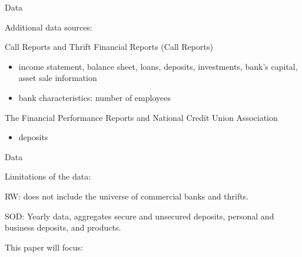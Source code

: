 \documentclass[notes,11pt, aspectratio=169]{beamer}
\newenvironment{wideitemize}{\itemize\addtolength{\itemsep}{10pt}}{\enditemize}
\begin{document}
    \begin{frame}{Data}

    Additional data sources:
    \vspace{0.3cm}
    \begin{wideitemize}
      \item Call Reports and Thrift Financial Reports (Call Reports)
        
      \begin{itemize}
          \item income statement, balance sheet, loans, deposits, investments,  bank's capital, asset sale information
          \item bank characteristics: number of employees
        
          
      \end{itemize}

      \item The Financial Performance Reports and National Credit Union Association
        \begin{itemize}
          \item deposits 
      \end{itemize}
    \end{wideitemize}

  \end{frame}
  \begin{frame}{Data}\label{data}
  
    Limitations of the data:

    \begin{wideitemize}
      \item RW: does not include the universe of commercial banks and thrifts.
      \item SOD: Yearly data, aggregates secure and unsecured deposits, personal and business deposits, and products.
    \end{wideitemize}

    \vspace{0.3cm}

    This paper will focus:
    \end{wideitemize}

    \end{frame}
\end{document}

